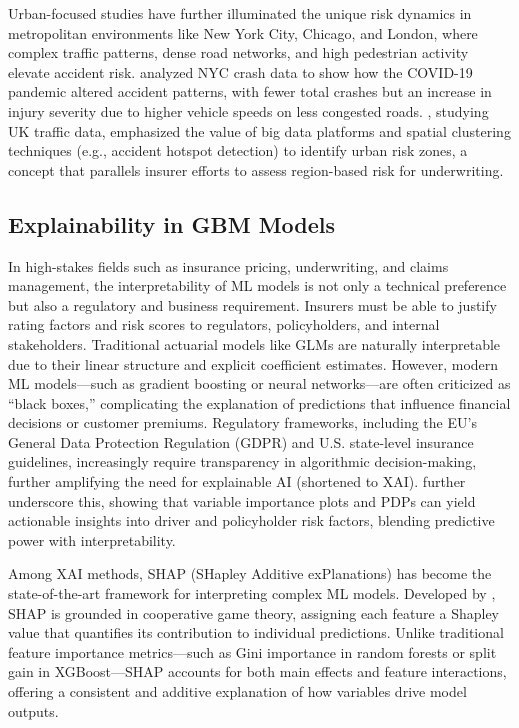 \documentclass[
  number,
  review,
  3p]{elsarticle}
\begin{document}
Urban-focused studies have further illuminated the unique risk dynamics
in metropolitan environments like New York City, Chicago, and London,
where complex traffic patterns, dense road networks, and high pedestrian
activity elevate accident risk. \citet{adeniyi} analyzed NYC crash data
to show how the COVID-19 pandemic altered accident patterns, with fewer
total crashes but an increase in injury severity due to higher vehicle
speeds on less congested roads. \citet{feng}, studying UK traffic data,
emphasized the value of big data platforms and spatial clustering
techniques (e.g., accident hotspot detection) to identify urban risk
zones, a concept that parallels insurer efforts to assess region-based
risk for underwriting.

\subsection{\texorpdfstring{\textbf{Explainability in GBM
Models}}{Explainability in GBM Models}}\label{explainability-in-gbm-models}

In high-stakes fields such as insurance pricing, underwriting, and
claims management, the interpretability of ML models is not only a
technical preference but also a regulatory and business requirement.
Insurers must be able to justify rating factors and risk scores to
regulators, policyholders, and internal stakeholders. Traditional
actuarial models like GLMs are naturally interpretable due to their
linear structure and explicit coefficient estimates. However, modern ML
models---such as gradient boosting or neural networks---are often
criticized as ``black boxes,'' complicating the explanation of
predictions that influence financial decisions or customer premiums.
Regulatory frameworks, including the EU's General Data Protection
Regulation (GDPR) and U.S. state-level insurance guidelines,
increasingly require transparency in algorithmic decision-making,
further amplifying the need for explainable AI (shortened to XAI).
\citet{henckaerts} further underscore this, showing that variable
importance plots and PDPs can yield actionable insights into driver and
policyholder risk factors, blending predictive power with
interpretability.

Among XAI methods, SHAP (SHapley Additive exPlanations) has become the
state-of-the-art framework for interpreting complex ML models. Developed
by \citet{lundberg}, SHAP is grounded in cooperative game theory,
assigning each feature a Shapley value that quantifies its contribution
to individual predictions. Unlike traditional feature importance
metrics---such as Gini importance in random forests or split gain in
XGBoost---SHAP accounts for both main effects and feature interactions,
offering a consistent and additive explanation of how variables drive
model outputs.
\end{document}
